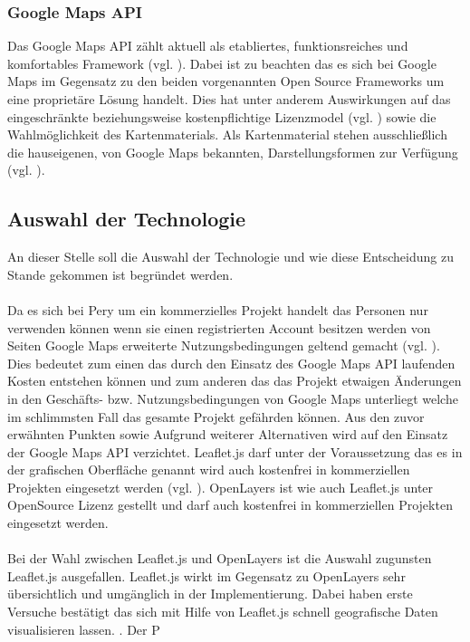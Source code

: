\documentclass[../Bachelorarbeit.tex]{subfiles}
\begin{document}
\subsubsection{Google Maps \ac{API}}
Das Google Maps \ac{API} zählt aktuell als etabliertes, funktionsreiches und    komfortables Framework (vgl. \cite[Abschnitt: Google Maps]{TestingWebMapApi}).  
Dabei ist zu beachten das es sich bei Google Maps im Gegensatz zu den beiden vorgenannten Open Source Frameworks um eine proprietäre Lösung handelt. 
Dies hat unter anderem Auswirkungen auf das eingeschränkte beziehungsweise kostenpflichtige Lizenzmodel (vgl. \cite{GoogleMapsNutzung}) sowie die Wahlmöglichkeit des Kartenmaterials. 
Als Kartenmaterial stehen ausschließlich die hauseigenen, von Google Maps bekannten, Darstellungsformen zur Verfügung (vgl. \cite[Abschnitt: Google Maps]{TestingWebMapApi}). 


\subsection{Auswahl der Technologie}
\label{AuswahlDerTechnologie}
An dieser Stelle soll die Auswahl der Technologie und wie diese Entscheidung zu Stande gekommen ist begründet werden. \\
\\
Da es sich bei Pery um ein kommerzielles Projekt handelt das Personen nur verwenden können wenn sie einen registrierten Account besitzen werden von Seiten Google Maps erweiterte Nutzungsbedingungen geltend gemacht (vgl. \cite[Abschnitt: Can I use the Google Maps APIs on a site that is password protected?]{GoogleMapsApiUsage}). 
Dies bedeutet zum einen das durch den Einsatz des Google Maps API laufenden Kosten entstehen können und zum anderen das das Projekt etwaigen Änderungen in den Geschäfts- bzw. Nutzungsbedingungen von Google Maps unterliegt welche im schlimmsten Fall das gesamte Projekt gefährden können.
Aus den zuvor erwähnten Punkten sowie Aufgrund weiterer Alternativen wird auf den Einsatz der Google Maps API verzichtet.
Leaflet.js darf unter der Voraussetzung das es in der grafischen Oberfläche genannt wird auch  kostenfrei in kommerziellen Projekten eingesetzt werden (vgl. \cite[Abschnitt: Commercial Use and Licensing]{LeafletLicense}).
OpenLayers ist wie auch Leaflet.js unter OpenSource Lizenz gestellt und darf auch kostenfrei in kommerziellen Projekten eingesetzt werden.\\
\\
Bei der Wahl zwischen Leaflet.js und OpenLayers ist die Auswahl zugunsten Leaflet.js ausgefallen. 
Leaflet.js wirkt im Gegensatz zu OpenLayers sehr übersichtlich und umgänglich in der Implementierung. 
Dabei haben erste Versuche bestätigt das sich mit Hilfe von Leaflet.js schnell geografische Daten visualisieren lassen. 
. 
Der P 
\end{document}
